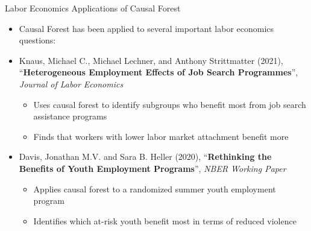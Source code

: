 \documentclass[dvipsnames,hyperref={pdfpagelabels=false}]{beamer}
\begin{document}
\begin{frame}{Labor Economics Applications of Causal Forest}
	\begin{itemize}
		\item Causal Forest has been applied to several important labor economics questions:
		\vspace{0.3cm}
		\item[] Knaus, Michael C., Michael Lechner, and Anthony Strittmatter (2021), ``\textbf{Heterogeneous Employment Effects of Job Search Programmes}'', \textit{Journal of Labor Economics}
		\vspace{0.2cm}
		\begin{itemize}
			\item Uses causal forest to identify subgroups who benefit most from job search assistance programs
			\vspace{0.2cm}
			\item Finds that workers with lower labor market attachment benefit more
		\end{itemize}
		\vspace{0.3cm}
		\item[] Davis, Jonathan M.V. and Sara B. Heller (2020), ``\textbf{Rethinking the Benefits of Youth Employment Programs}'', \textit{NBER Working Paper}
		\vspace{0.2cm}
		\begin{itemize}
			\item Applies causal forest to a randomized summer youth employment program
			\vspace{0.2cm}
			\item Identifies which at-risk youth benefit most in terms of reduced violence
		\end{itemize}
	\end{itemize}
\end{frame}
\end{document}
